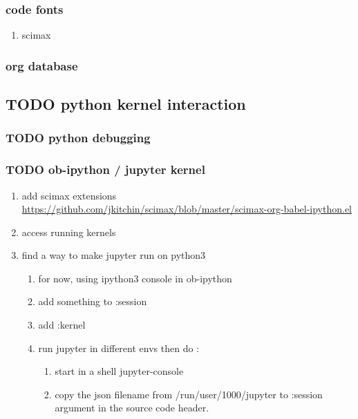 \documentclass[11pt]{article}
\begin{document}
\subsubsection{code fonts}
\label{sec:orgd136882}
\begin{enumerate}
\item scimax
\label{sec:org55e7dcc}
\end{enumerate}
\subsubsection{org database}
\label{sec:org9c27b81}
\subsection{{\bfseries\sffamily TODO} python kernel interaction}
\label{sec:org97de51c}
\subsubsection{{\bfseries\sffamily TODO} python debugging}
\label{sec:org7740b7d}
\subsubsection{{\bfseries\sffamily TODO} ob-ipython / jupyter kernel}
\label{sec:org43c3ee7}
\begin{enumerate}
\item add scimax extensions
\label{sec:orgf62fecc}
\url{https://github.com/jkitchin/scimax/blob/master/scimax-org-babel-ipython.el}
\item access running kernels
\label{sec:org942564a}
\item find a way to make jupyter run on python3
\label{sec:orgf1cd701}
\begin{enumerate}
\item for now, using ipython3 console in ob-ipython
\label{sec:org9abf161}
\item add something to :session
\label{sec:org2f2f44d}
\item add :kernel
\label{sec:orgb82c4f0}
\item run jupyter in different envs
\label{sec:org362f39f}
then do :
\begin{enumerate}
\item start in a shell jupyter-console
\item copy the json filename from /run/user/1000/jupyter to :session argument in the source code header.
\end{enumerate}
\end{enumerate}
\end{enumerate}
\end{document}
